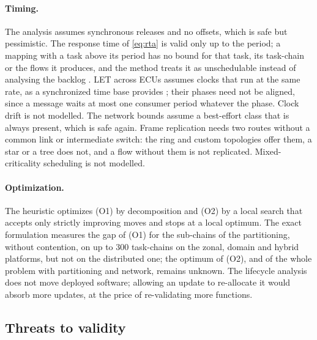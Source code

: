\paragraph{Timing.} The analysis assumes synchronous releases and no
offsets, which is safe but pessimistic. The response time of
\cref{eq:rta} is valid only up to the period; a mapping with a task above
its period has no bound for that task, its task-chain or the flows it
produces, and the method treats it as unschedulable instead of analysing
the backlog \cite{lehoczky1990fixed}. LET across ECUs assumes clocks
that run at the same rate, as a synchronized time base provides
\cite{gemlau2021system}; their phases need not be aligned, since a message
waits at most one consumer period whatever the phase. Clock drift is not
modelled. The
network bounds assume a best-effort class that is always present, which is
safe again. Frame replication needs two routes without a common link or
intermediate switch: the ring and custom topologies offer them, a star or
a tree does not, and a flow without them is not replicated.
Mixed-criticality scheduling is not modelled.

\paragraph{Optimization.} The heuristic optimizes (O1) by decomposition and
(O2) by a local search that accepts only strictly improving moves and stops
at a local optimum. The exact formulation measures the gap of (O1) for
the sub-chains of the partitioning, without contention, on up to 300
task-chains on the zonal, domain and hybrid platforms, but not on the
distributed one; the optimum of (O2), and of the whole problem with
partitioning and network, remains unknown. The lifecycle analysis does not
move deployed software; allowing an update to re-allocate it would absorb
more updates, at the price of re-validating more functions.

\subsection{Threats to validity}

